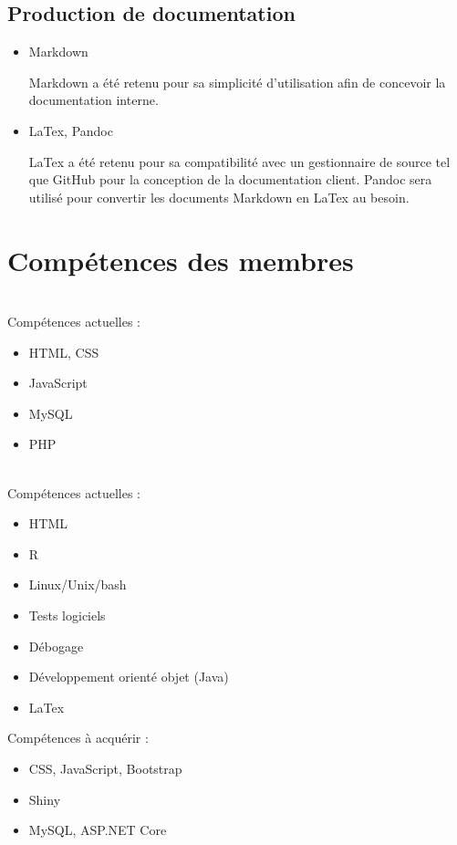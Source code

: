 \documentclass[letter,12pt]{exam}
\begin{document}
\subsection{Production de documentation}

\begin{itemize}

\item
  Markdown

  Markdown a été retenu pour sa simplicité d'utilisation afin de concevoir la documentation interne.
\item
  LaTex, Pandoc

  LaTex a été retenu pour sa compatibilité avec un gestionnaire de source tel que GitHub pour la conception de la documentation client. Pandoc sera utilisé pour convertir les documents Markdown en LaTex au besoin.

\end{itemize}

\section{Compétences des membres}

\\

Compétences actuelles :

\begin{itemize}
\item
  HTML, CSS

\item JavaScript

\item MySQL

\item PHP

\end{itemize}

\\

Compétences actuelles :

\begin{itemize}
\item HTML

\item R

\item Linux/Unix/bash

\item Tests logiciels

\item Débogage

\item Développement orienté objet (Java)

\item LaTex

\end{itemize}


Compétences à acquérir :

\begin{itemize}

\item CSS, JavaScript, Bootstrap

\item Shiny

\item MySQL, ASP.NET Core

\end{itemize}
\end{document}
